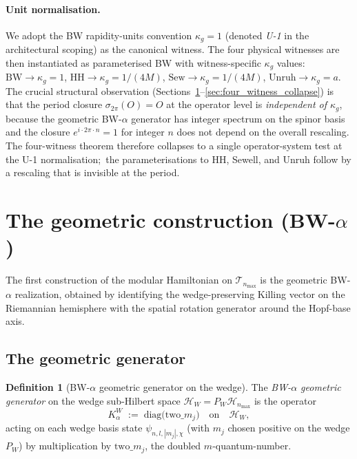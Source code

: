 \documentclass[11pt,a4paper]{article}
\theoremstyle{plain}
\theoremstyle{definition}
\newtheorem{definition}[theorem]{Definition}
\newcommand{\nmax}{n_{\max}}
\newcommand{\Hilb}{\mathcal{H}}
\newcommand{\Tcal}{\mathcal{T}}
\newcommand{\BW}{\mathrm{BW}}
\newcommand{\HH}{\mathrm{HH}}
\newcommand{\Sew}{\mathrm{Sew}}
\newcommand{\Unruh}{\mathrm{Unruh}}
\begin{document}
\paragraph{Unit normalisation.}
We adopt the BW rapidity-units convention $\kappa_g = 1$ (denoted
\emph{U-1} in the architectural scoping) as the canonical witness.
The four physical witnesses are then instantiated as parameterised
BW with witness-specific $\kappa_g$ values: $\BW \to \kappa_g = 1$,
$\HH \to \kappa_g = 1/(4M)$, $\Sew \to \kappa_g = 1/(4M)$,
$\Unruh \to \kappa_g = a$. The crucial structural observation
(Sections~\ref{sec:geometric_construction}--\ref{sec:four_witness_collapse})
is that the period closure $\sigma_{2\pi}(O) = O$ at the operator level
is \emph{independent of $\kappa_g$}, because the geometric BW-$\alpha$
generator has integer spectrum on the spinor basis and the closure
$e^{i \cdot 2\pi \cdot n} = 1$ for integer $n$ does not depend on the
overall rescaling. The four-witness theorem therefore collapses to a
single operator-system test at the U-1 normalisation;\ the
parameterisations to HH, Sewell, and Unruh follow by a rescaling that
is invisible at the period.

\section{The geometric construction (BW-$\alpha$)}
\label{sec:geometric_construction}

The first construction of the modular Hamiltonian on
$\Tcal_{\nmax}$ is the geometric BW-$\alpha$ realization, obtained by
identifying the wedge-preserving Killing vector on the Riemannian
hemisphere with the spatial rotation generator around the Hopf-base
axis.

\subsection{The geometric generator}\label{sec:K_alpha_W}

\begin{definition}[BW-$\alpha$ geometric generator on the wedge]
\label{def:K_alpha_W}
The \emph{BW-$\alpha$ geometric generator} on the wedge sub-Hilbert
space $\Hilb_W = P_W \Hilb_{\nmax}$ is the operator
\begin{equation}\label{eq:K_alpha_W_def}
   K_\alpha^W \;:=\; \mathrm{diag}\bigl(\mathrm{two}\_m_j\bigr)
   \quad \text{on} \quad \Hilb_W,
\end{equation}
acting on each wedge basis state $\psi_{n, l, |m_j|, \chi}$ (with
$m_j$ chosen positive on the wedge $P_W$) by multiplication by
$\mathrm{two}\_m_j$, the doubled $m$-quantum-number.
\end{definition}
\end{document}
